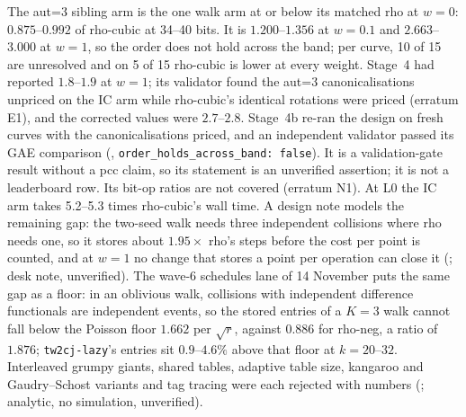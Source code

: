 The aut=3 sibling arm is the one walk arm at or below its matched rho at
$w=0$: $0.875$--$0.992$ of rho-cubic at 34--40 bits. It is $1.200$--$1.356$
at $w=0.1$ and $2.663$--$3.000$ at $w=1$, so the order does not hold
across the band; per curve, 10 of 15 are unresolved and on 5 of 15 rho-cubic
is lower at every weight. Stage~4 had reported $1.8$--$1.9$ at $w=1$; its
validator found the aut=3 canonicalisations unpriced on the IC arm while
rho-cubic's identical rotations were priced (erratum E1), and the
corrected values were $2.7$--$2.8$. Stage~4b re-ran the design on fresh
curves with the canonicalisations priced, and an independent validator
passed its GAE comparison (,
\texttt{order\_holds\_across\_band: false}). It is a validation-gate result
without a pcc claim, so its statement is an unverified assertion; it is not
a leaderboard row. Its bit-op ratios are not covered (erratum N1). At L0
the IC arm takes 5.2--5.3 times rho-cubic's wall time. A design note
models the remaining gap: the two-seed walk needs three independent
collisions where rho needs one, so it stores about $1.95\times$ rho's steps
before the cost per point is counted, and at $w=1$ no change that stores a
point per operation can close it
(;
desk note, unverified). The wave-6 schedules lane of 14 November puts the
same gap as a floor: in an oblivious walk, collisions with independent
difference functionals are independent events, so the stored entries of a
$K=3$ walk cannot fall below the Poisson floor $1.662$ per $\sqrt r$,
against $0.886$ for rho-neg, a ratio of $1.876$; \texttt{tw2cj-lazy}'s
entries sit $0.9$--$4.6\%$ above that floor at $k=20$--$32$. Interleaved
grumpy giants, shared tables, adaptive table size, kangaroo and
Gaudry--Schost variants and tag tracing were each rejected with numbers
(;
analytic, no simulation, unverified).

